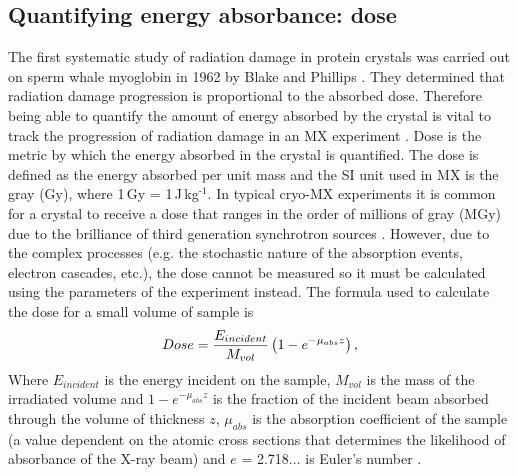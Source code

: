     \subsection{Quantifying energy absorbance: dose}
    \label{sub:Quantifying energy absorbance: Dose}
        The first systematic study of radiation damage in protein crystals was carried out on sperm whale myoglobin in 1962 by Blake and Phillips \cite{blake1962}.
        They determined that radiation damage progression is proportional to the absorbed dose.
        Therefore being able to quantify the amount of energy absorbed by the crystal is vital to track the progression of radiation damage in an MX experiment \cite{blake1962,holton2009}.
        Dose is the metric by which the energy absorbed in the crystal is quantified.
        The dose is defined as the energy absorbed per unit mass and the SI unit used in MX is the gray (Gy), where 1\,Gy = 1\,J\,kg$^{\text{-1}}$.
        In typical cryo-MX experiments it is common for a crystal to receive a dose that ranges in the order of millions of gray (MGy) \cite{garman2010} due to the brilliance of third generation synchrotron sources \cite{mitchell1999}.
        However, due to the complex processes (e.g. the stochastic nature of the absorption events, electron cascades, etc.), the dose cannot be measured so it must be calculated using the parameters of the experiment instead.
        The formula used to calculate the dose for a small volume of sample is
        \begin{equation}
            Dose = \frac{E_{incident}}{M_{vol}} \left(1- e^{-\mu_{abs}z}\right),
            \label{eq:Dose Calculation 1D}
        \end{equation}
        Where $E_{incident}$ is the energy incident on the sample, $M_{vol}$ is the mass of the irradiated volume and $1- e^{-\mu_{abs}z}$ is the fraction of the incident beam absorbed through the volume of thickness $z$, $\mu_{abs}$ is the absorption coefficient of the sample (a value dependent on the atomic cross sections that determines the likelihood of absorbance of the X-ray beam) and $e$ = 2.718$\ldots$ is Euler's number \cite{zeldin2013thesis}.

